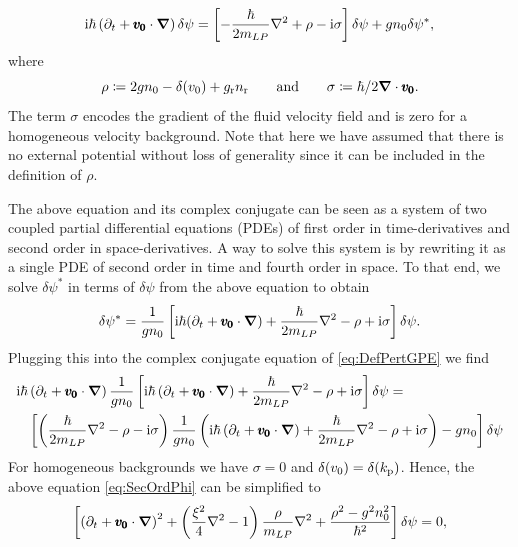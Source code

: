 \begin{equation}
    \mathrm{i} \hbar \left(\partial_t+\pmb{v_0}\cdot{\boldsymbol{\nabla}}\right)\delta\psi=\left[-\frac{\hbar}{2m_{LP}}\nabla^2+\rho-\mathrm{i}\sigma\right]\delta \psi+g n_0 \delta\psi^*,
        \label{eq:DefPertGPE}
\end{equation}
where $$\rho\coloneqq2g n_0- \delta(v_0)+g_{\rm r}n_{\rm r}\qquad\text{and}\qquad\sigma\coloneqq\hbar/2\boldsymbol{\nabla} \cdot\pmb{v_0}.$$
The term $\sigma$ encodes the gradient of the fluid velocity field and is zero for a homogeneous velocity background. 
Note that here we have assumed that there is no external potential without loss of generality since it can be included in the definition of $\rho$.

\bigskip

The above equation and its complex conjugate can be seen as a system of two coupled partial differential equations (PDEs) of first order in time-derivatives and second order in space-derivatives. A way to solve this system is by rewriting it as a single PDE of second order in time and fourth order in space. To that end, we solve $\delta \psi^*$ in terms of $\delta \psi$ from the above equation to obtain
\begin{equation}
    \delta \psi^*=\frac{1}{g n_0}\left[\mathrm{i} \hbar (\partial_t+\pmb{v_0}\cdot{\boldsymbol{\nabla}})+\frac{\hbar}{2m_{LP}}\nabla^2-\rho+\mathrm{i}\sigma\right]\delta \psi.
    \label{eq:hydropsi_conj}
\end{equation}
Plugging this into the complex conjugate equation of \eqref{eq:DefPertGPE} we find
\begin{equation}
\begin{split}
    \mathrm{i} \hbar &\left(\partial_t+\pmb{v_0}\cdot{\boldsymbol{\nabla}}\right)\frac{1}{g n_0}\left[\mathrm{i} \hbar \left(\partial_t+\pmb{v_0}\cdot{\boldsymbol{\nabla}}\right)+\frac{\hbar}{2m_{LP}}\nabla^2-\rho+\mathrm{i}\sigma\right]\delta \psi=\\
    &\left[\left(\frac{\hbar}{2m_{LP}}\nabla^2-\rho-\mathrm{i}\sigma\right)\frac{1}{g n_0}\left(\mathrm{i} \hbar \left(\partial_t+\pmb{v_0}\cdot{\boldsymbol{\nabla}}\right)+\frac{\hbar}{2m_{LP}}\nabla^2-\rho+\mathrm{i}\sigma\right)-g n_0\right] \delta \psi
\end{split}
    \label{eq:SecOrdPhi}
\end{equation}
For homogeneous backgrounds we have $\sigma=0$ and $\delta(v_0)=\delta(k_{\mathrm{p}})$. Hence, the above equation \eqref{eq:SecOrdPhi} can be simplified to
\begin{equation}
    \left[\left(\partial_t+\pmb{v_0}\cdot{\boldsymbol{\nabla}}\right)^2+\left(\frac{\xi^2}{4}\nabla^2-1\right)\frac{\rho}{m_{LP}}\nabla^2+\frac{\rho^2-g^2n_0^2}{\hbar^2}\right]\delta \psi=0,
\end{equation}
